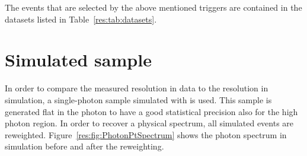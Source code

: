 The events that are selected by the above mentioned triggers are contained in the datasets listed in Table~\ref{res:tab:datasets}.
\renewcommand{\arraystretch}{1.5}
\begin{table}[!hbt]
\centering
\caption{Single-photon data samples used for the resolution measurement with the contained integrated luminosity.}
\label{res:tab:datasets}
\end{table}  

\section{Simulated sample}
\label{res:sec:SimulatedSamples}

In order to compare the measured resolution in data to the resolution in simulation, a single-photon sample simulated with \pythiaSix is used.
This sample is generated flat in the photon \pt to have a good statistical precision also for the high photon \pt region.
In order to recover a physical \pt spectrum, all simulated events are reweighted.
Figure~\ref{res:fig:PhotonPtSpectrum} shows the photon \pt spectrum in simulation before and after the reweighting. 

